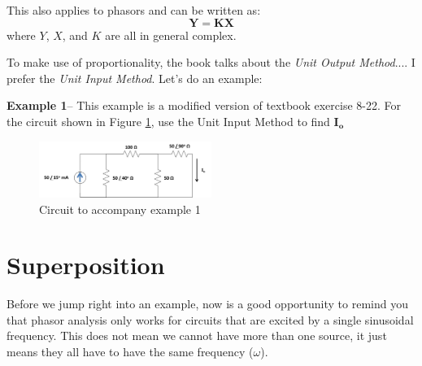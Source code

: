 \documentclass{handout}
\begin{document}
This also applies to phasors and can be written as:
\[
\mathbf{Y} = \mathbf{KX}
\]
where $Y$, $X$, and $K$ are all in general complex.

To make use of proportionality, the book talks about the {\em Unit Output Method}.... I prefer the {\em Unit Input Method}.  Let's do an example:

\textbf{Example 1}-- This example is a modified version of textbook exercise 8-22.  For the circuit shown in Figure \ref{fig: Example1}, use the Unit Input Method to find $\mathbf{I_o}$

\begin{figure} [h!]
\centering
\includegraphics[width=0.5\textwidth]{Example1.jpg}
\caption{Circuit to accompany example 1}
\label{fig: Example1}
\end{figure}




\newpage
\clearpage
\pagebreak

\section{Superposition}
Before we jump right into an example, now is a good opportunity to remind you that phasor analysis only works for circuits that are excited by a single sinusoidal frequency.  This does not mean we cannot have more than one source, it just means they all have to have the same frequency ($\omega$).
\end{document}
